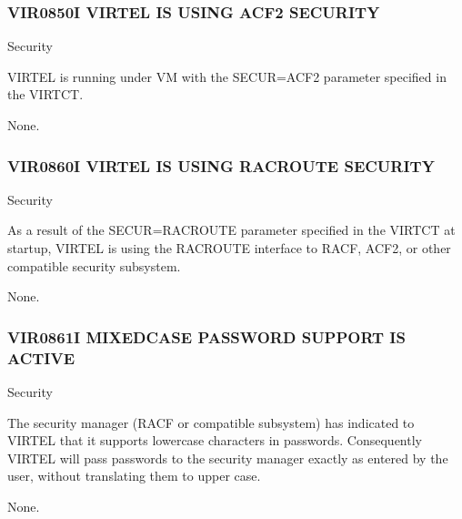 \documentclass[letterpaper,10pt,english]{sphinxmanual}
\begin{document}
\subsubsection{VIR0850I VIRTEL IS USING ACF2 SECURITY}
\label{\detokenize{messages:vir0850i-virtel-is-using-acf2-security}}\begin{description}
\sphinxAtStartPar
Security

\sphinxAtStartPar
VIRTEL is running under VM with the SECUR=ACF2 parameter specified in the VIRTCT.

\sphinxAtStartPar
None.

\end{description}


\subsubsection{VIR0860I VIRTEL IS USING RACROUTE SECURITY}
\label{\detokenize{messages:vir0860i-virtel-is-using-racroute-security}}\begin{description}
\sphinxAtStartPar
Security

\sphinxAtStartPar
As a result of the SECUR=RACROUTE parameter specified in the VIRTCT at startup, VIRTEL is using the RACROUTE interface to RACF, ACF2, or other compatible security sub\sphinxhyphen{}system.

\sphinxAtStartPar
None.

\end{description}


\subsubsection{VIR0861I MIXED\sphinxhyphen{}CASE PASSWORD SUPPORT IS ACTIVE}
\label{\detokenize{messages:vir0861i-mixed-case-password-support-is-active}}\begin{description}
\sphinxAtStartPar
Security

\sphinxAtStartPar
The security manager (RACF or compatible sub\sphinxhyphen{}system) has indicated to VIRTEL that it supports lower\sphinxhyphen{}case characters in passwords. Consequently VIRTEL will pass passwords to the security manager exactly as entered by the user, without translating them to upper case.

\sphinxAtStartPar
None.

\end{description}
\end{document}
